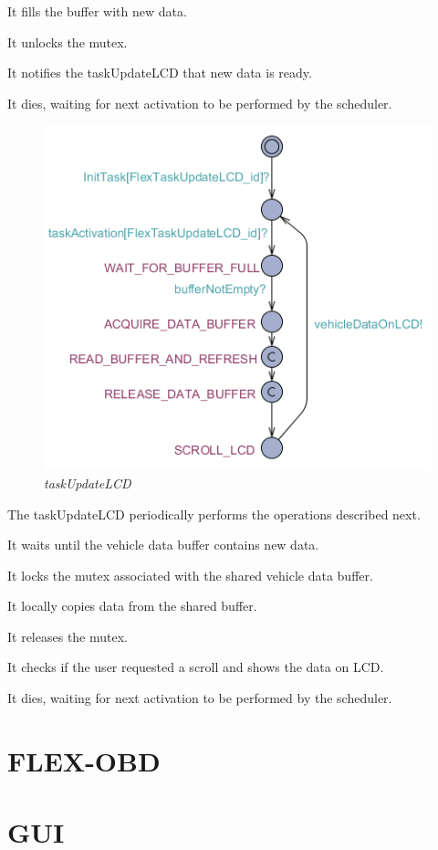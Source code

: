 \documentclass[paper=a4, fontsize=11pt]{scrartcl} %
\numberwithin{equation}{section} %
\numberwithin{figure}{section} %
\numberwithin{table}{section} %
\begin{document}
It fills the buffer with new data.

It unlocks the mutex.

It notifies the taskUpdateLCD that new data is ready.

It dies, waiting for next activation to be performed by the scheduler.

\begin{figure}[H]
  \centering
  \includegraphics[width=4.5in]{img/FLEX-OBD-LCD_taskUpdateLCD}
  \caption{\textit{taskUpdateLCD}}
\end{figure}

The taskUpdateLCD periodically performs the operations described next.

It waits until the vehicle data buffer contains new data.

It locks the mutex associated with the shared vehicle data buffer.

It locally copies data from the shared buffer.

It releases the mutex.

It checks if the user requested a scroll and shows the data on LCD.

It dies, waiting for next activation to be performed by the scheduler.

\section{FLEX-OBD}
\section{GUI}
\end{document}
